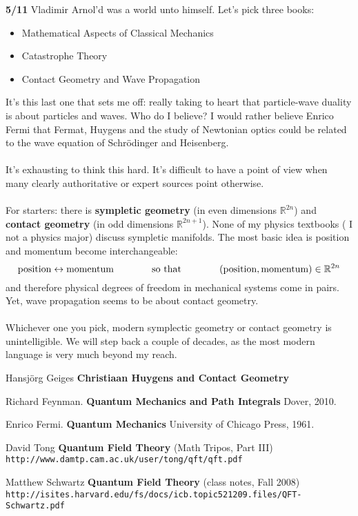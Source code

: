 \documentclass[12pt]{article}
\begin{document}
\newpage

\noindent \textbf{5/11} Vladimir Arnol'd was a world unto himself.  Let's pick three books:
\begin{itemize}
\item Mathematical Aspects of Classical Mechanics 
\item Catastrophe Theory
\item Contact Geometry and Wave Propagation
\end{itemize}
It's this last one that sets me off: really taking to heart that particle-wave duality is about particles and waves.  Who do I believe?  I would rather believe Enrico Fermi that Fermat, Huygens and the study of Newtonian optics could be related to the wave equation of Schr\"{o}dinger and Heisenberg.  \\ \\
It's exhausting to think this hard.  It's difficult to have a point of view when many clearly authoritative or expert sources point otherwise.  \\ \\
For starters: there is \textbf{sympletic geometry} (in even dimensions $\mathbb{R}^{2n}$) and \textbf{contact geometry} (in odd dimensions $\mathbb{R}^{2n+1}$).  None of my physics textbooks ( I not a physics major) discuss sympletic manifolds.  The most basic idea is position and momentum become interchangeable: 
$$\text{position} \leftrightarrow \text{momentum} \hspace{0.5in}\text{ so that }\hspace{0.5in} (\text{position}, \text{momentum}) \in \mathbb{R}^{2n} $$
and therefore physical degrees of freedom in mechanical systems come in pairs.  Yet, wave propagation seems to be about contact geometry. \\ \\
Whichever one you pick, modern symplectic geometry or contact geometry is unintelligible.  We will step back a couple of decades, as the most modern language is very much beyond my reach. 

\vfill

\begin{thebibliography}{}

\item Hansjörg Geiges \textbf{Christiaan Huygens and Contact Geometry}

\item Richard Feynman.  \textbf{Quantum Mechanics and Path Integrals} Dover, 2010.

\item Enrico Fermi.  \textbf{Quantum Mechanics} University of Chicago Press, 1961.

\item David Tong \textbf{Quantum Field Theory} (Math Tripos, Part III)  \\ \texttt{http://www.damtp.cam.ac.uk/user/tong/qft/qft.pdf}

\item Matthew Schwartz \textbf{Quantum Field Theory} (class notes, Fall 2008) \\
\texttt{http://isites.harvard.edu/fs/docs/icb.topic521209.files/QFT-Schwartz.pdf}

\end{thebibliography}
\end{document}
